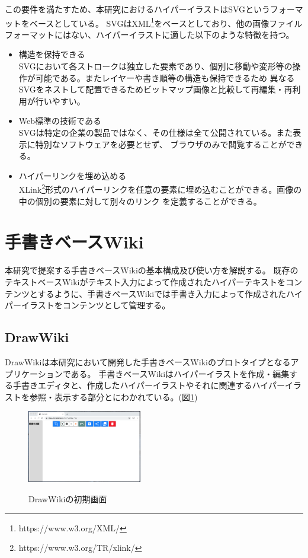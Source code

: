この要件を満たすため、本研究におけるハイパーイラストはSVG\cite{aboutsvg}というフォーマットをベースとしている。
SVGはXML\footnote{https://www.w3.org/XML/}をベースとしており、他の画像ファイルフォーマットにはない、ハイパーイラストに適した以下のような特徴を持つ。
\begin{itemize}
    \item 構造を保持できる\\
    SVGにおいて各ストロークは独立した要素であり、個別に移動や変形等の操作が可能である。またレイヤーや書き順等の構造も保持できるため
    異なるSVGをネストして配置できるためビットマップ画像と比較して再編集・再利用が行いやすい。
    \item Web標準の技術である\\
    SVGは特定の企業の製品ではなく、その仕様は全て公開されている。また表示に特別なソフトウェアを必要とせず、
    ブラウザのみで閲覧することができる。
    \item ハイパーリンクを埋め込める\\
    XLink\footnote{https://www.w3.org/TR/xlink/}形式のハイパーリンクを任意の要素に埋め込むことができる。画像の中の個別の要素に対して別々のリンク
    を定義することができる。
\end{itemize}

\section{手書きベースWiki}
本研究で提案する手書きベースWikiの基本構成及び使い方を解説する。
既存のテキストベースWikiがテキスト入力によって作成されたハイパーテキストをコンテンツとするように、手書きベースWikiでは手書き入力によって作成されたハイパーイラストをコンテンツとして管理する。

\subsection{DrawWiki}
DrawWikiは本研究において開発した手書きベースWikiのプロトタイプとなるアプリケーションである。
手書きベースWikiはハイパーイラストを作成・編集する手書きエディタと、作成したハイパーイラストやそれに関連するハイパーイラストを参照・表示する部分とにわかれている。(図\ref{drawwiki})
\begin{figure}[htbp]
    \begin{center}
    {\includegraphics[width=50mm]{images/initialdrawwiki.png}} \end{center}
    \caption{DrawWikiの初期画面}
    \label{drawwiki}
\end{figure}



